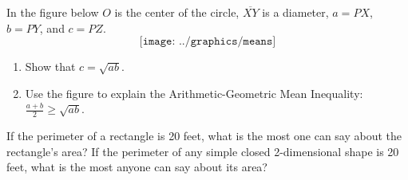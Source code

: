 \begin{prob}
In the figure below  $O$ is the center of the circle, $\overline{XY}$ is a diameter, $a = PX$, $b=PY$, and $c=PZ$.  
$$\texttt{[image: ../graphics/means]}$$
\begin{enumerate}
\item Show that $c=\sqrt{ab}$.  
\item Use the figure to explain the Arithmetic-Geometric Mean Inequality: $\frac{a+b}{2} \ge \sqrt{ab}$.  
\end{enumerate}
\end{prob}

\begin{prob}
If the perimeter of a rectangle is 20 feet, what is the most one can say about the rectangle's area?  If the perimeter of any simple closed 2-dimensional shape is 20 feet, what is the most anyone can say about its area?
\end{prob}


%


